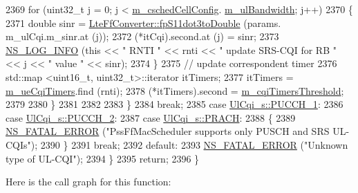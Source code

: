 \begin{DoxyCode}
2369             \textcolor{keywordflow}{for} (uint32\_t j = 0; j < \hyperlink{classns3_1_1PssFfMacScheduler_a6808e2b2024ed0ced82f80bfe6f0801f}{m\_cschedCellConfig}.
      \hyperlink{structns3_1_1FfMacCschedSapProvider_1_1CschedCellConfigReqParameters_a5ab5b102878e6e7e7727a14af4a64d2f}{m\_ulBandwidth}; j++)
2370               \{
2371                 \textcolor{keywordtype}{double} sinr = \hyperlink{classns3_1_1LteFfConverter_aa5d8c2a8f988dbd63da91818c18666eb}{LteFfConverter::fpS11dot3toDouble} (params.
      m\_ulCqi.m\_sinr.at (j));
2372                 (*itCqi).second.at (j) = sinr;
2373                 \hyperlink{group__logging_gafbd73ee2cf9f26b319f49086d8e860fb}{NS\_LOG\_INFO} (\textcolor{keyword}{this} << \textcolor{stringliteral}{" RNTI "} << rnti << \textcolor{stringliteral}{" update SRS-CQI for RB  "} << j << \textcolor{stringliteral}{"
       value "} << sinr);
2374               \}
2375             \textcolor{comment}{// update correspondent timer}
2376             std::map <uint16\_t, uint32\_t>::iterator itTimers;
2377             itTimers = \hyperlink{classns3_1_1PssFfMacScheduler_a1cc9115fabab47bd1c6de8fa20725782}{m\_ueCqiTimers}.find (rnti);
2378             (*itTimers).second = \hyperlink{classns3_1_1PssFfMacScheduler_a56d836fa470b6d79eca2b03258325373}{m\_cqiTimersThreshold};
2379 
2380           \}
2381 
2382 
2383       \}
2384       \textcolor{keywordflow}{break};
2385     \textcolor{keywordflow}{case} \hyperlink{structns3_1_1UlCqi__s_aece9e5ebea42eb9ff1744c72c8459b57a05ca6554bc6fcd96a0a51fbaa8e794c7}{UlCqi\_s::PUCCH\_1}:
2386     \textcolor{keywordflow}{case} \hyperlink{structns3_1_1UlCqi__s_aece9e5ebea42eb9ff1744c72c8459b57a35664b4bda6f1cd6acfe9edc84c7571d}{UlCqi\_s::PUCCH\_2}:
2387     \textcolor{keywordflow}{case} \hyperlink{structns3_1_1UlCqi__s_aece9e5ebea42eb9ff1744c72c8459b57af93f36792cb1eed08f6119e4abfe58e8}{UlCqi\_s::PRACH}:
2388       \{
2389         \hyperlink{group__fatal_ga5131d5e3f75d7d4cbfd706ac456fdc85}{NS\_FATAL\_ERROR} (\textcolor{stringliteral}{"PssFfMacScheduler supports only PUSCH and SRS UL-CQIs"});
2390       \}
2391       \textcolor{keywordflow}{break};
2392     \textcolor{keywordflow}{default}:
2393       \hyperlink{group__fatal_ga5131d5e3f75d7d4cbfd706ac456fdc85}{NS\_FATAL\_ERROR} (\textcolor{stringliteral}{"Unknown type of UL-CQI"});
2394     \}
2395   \textcolor{keywordflow}{return};
2396 \}
\end{DoxyCode}


Here is the call graph for this function\+:




